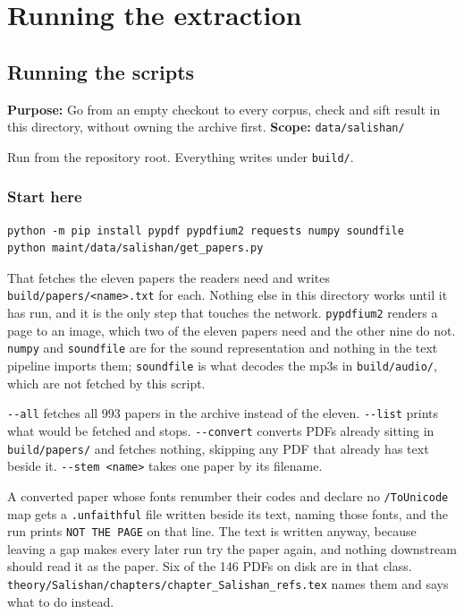 \chapter{Running the extraction}

\section{Running the scripts}

\textbf{Purpose:} Go from an empty checkout to every corpus, check and sift result in this directory, without owning the archive first. \textbf{Scope:} \texttt{data/\allowbreak{}salishan/\allowbreak{}}

Run from the repository root. Everything writes under \texttt{build/\allowbreak{}}.

\subsection{Start here}

\begin{lstlisting}[breaklines=true,breakatwhitespace=false,basicstyle=\ttfamily\small]
python -m pip install pypdf pypdfium2 requests numpy soundfile
python maint/data/salishan/get_papers.py
\end{lstlisting}

That fetches the eleven papers the readers need and writes \texttt{build/\allowbreak{}papers/\allowbreak{}<name>.\allowbreak{}txt} for each. Nothing else in this directory works until it has run, and it is the only step that touches the network. \texttt{pypdfium2} renders a page to an image, which two of the eleven papers need and the other nine do not. \texttt{numpy} and \texttt{soundfile} are for the sound representation and nothing in the text pipeline imports them; \texttt{soundfile} is what decodes the mp3s in \texttt{build/\allowbreak{}audio/\allowbreak{}}, which are not fetched by this script.

\texttt{-\allowbreak{}-\allowbreak{}all} fetches all 993 papers in the archive instead of the eleven. \texttt{-\allowbreak{}-\allowbreak{}list} prints what would be fetched and stops. \texttt{-\allowbreak{}-\allowbreak{}convert} converts PDFs already sitting in \texttt{build/\allowbreak{}papers/\allowbreak{}} and fetches nothing, skipping any PDF that already has text beside it. \texttt{-\allowbreak{}-\allowbreak{}stem <name>} takes one paper by its filename.

A converted paper whose fonts renumber their codes and declare no \texttt{/\allowbreak{}To\allowbreak{}Unicode} map gets a \texttt{.\allowbreak{}unfaithful} file written beside its text, naming those fonts, and the run prints \texttt{NOT THE PAGE} on that line. The text is written anyway, because leaving a gap makes every later run try the paper again, and nothing downstream should read it as the paper. Six of the 146 PDFs on disk are in that class. \texttt{theory/\allowbreak{}Salishan/\allowbreak{}chapters/\allowbreak{}chapter\_\allowbreak{}Salishan\_\allowbreak{}refs.\allowbreak{}tex} names them and says what to do instead.

